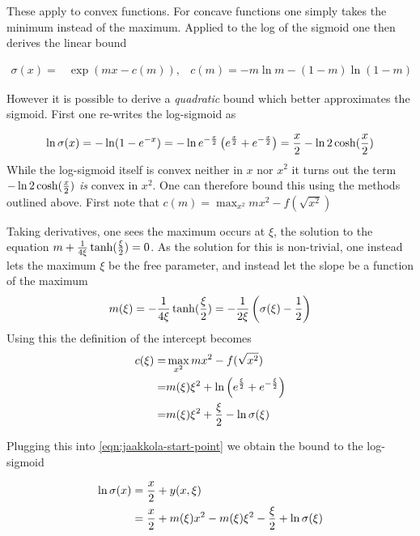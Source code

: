 These apply to convex functions. For concave functions one simply takes the minimum instead of the maximum. Applied to the log of the sigmoid one then derives the linear bound

\begin{align}
\sigma(x) = & \exp(mx - c(m)), & c(m) = -m \ln m - (1-m) \ln (1-m)
\end{align}

However it is possible to derive a \emph{quadratic} bound which better approximates the sigmoid. First one re-writes the log-sigmoid as

\begin{equation}
\ln \sigma(x) = -\ln (1 - e^{-x}) = -\ln e^{-\frac{x}{2}} \left( e^{\frac{x}{2}} + e^{-\frac{x}{2}} \right) = \frac{x}{2} - \ln 2 \cosh (\frac{x}{2}) \label{eqn:jaakkola-start-point}
\end{equation}
 While the log-sigmoid itself is convex neither in $x$ nor $x^2$ it turns out the term $-\ln 2 \cosh (\frac{x}{2})$ \emph{is} convex in $x^2$. One can therefore bound this using the methods outlined above. First note that $c(m) = \max_{x^2} mx^2 - f(\sqrt{x^2})$ 

Taking derivatives, one sees the maximum occurs at $\xi$, the solution to the equation $m + \frac{1}{4 \xi} \tanh (\frac{\xi}{2}) = 0$. As the solution for this is non-trivial, one instead lets the maximum $\xi$ be the free parameter, and instead let the slope be a function of the maximum
\begin{align}
m(\xi) = -\frac{1}{4\xi} \tanh (\frac{\xi}{2}) = -\frac{1}{2\xi} \left(\sigma(\xi) - \frac{1}{2}\right)
\end{align}
Using this the definition of the intercept becomes
\begin{align}
\begin{split}
c(\xi) = & \max_{x^2} mx^2 - f(\sqrt{x^2}) \\
 = & m(\xi)\xi^2 + \ln \left(e^{\frac{\xi}{2}} + e^{-\frac{\xi}{2}} \right) \\
 = & m(\xi)\xi^2 + \frac{\xi}{2} - \ln \sigma (\xi)
\end{split}
\end{align}


Plugging this into \eqref{eqn:jaakkola-start-point} we obtain the bound to the log-sigmoid

\begin{align}
\begin{split}
\ln \sigma(x) & = \frac{x}{2} + y(x, \xi) \\
 & = \frac{x}{2} + m(\xi)x^2 - m(\xi)\xi^2 - \frac{\xi}{2} + \ln \sigma(\xi)
\end{split}
\end{align}

